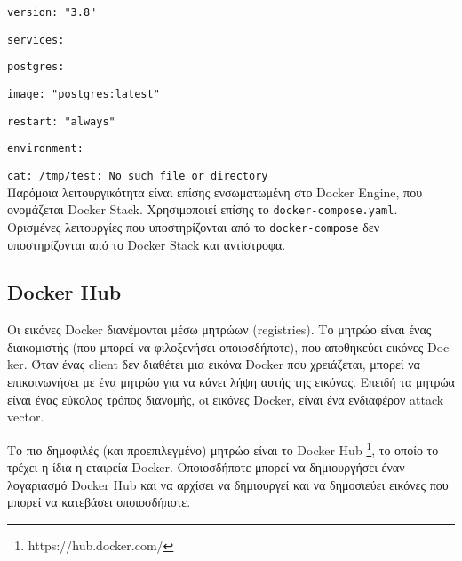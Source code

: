 \texttt{\textlatin{version: "3.8"}}

\texttt{\textlatin{services:}}

\texttt{\textlatin{postgres:}}

\texttt{\textlatin{image: "postgres:latest"}}

\texttt{\textlatin{restart: "always"}}

\texttt{\textlatin{environment:}}

\texttt{\textlatin{cat: /tmp/test: No such file or directory}} \\

Παρόμοια λειτουργικότητα είναι επίσης ενσωματωμένη στο
\textlatin{Docker Engine}, που ονομάζεται \textlatin{Docker Stack}.
Χρησιμοποιεί επίσης το \texttt{\textlatin{docker-compose.yaml}}. Ορισμένες
λειτουργίες που υποστηρίζονται από το \texttt{\textlatin{docker-compose}} δεν
υποστηρίζονται από το \textlatin{Docker Stack} και αντίστροφα.


\subsection{\textlatin{Docker Hub}}

Οι εικόνες \textlatin{Docker} διανέμονται μέσω μητρώων (\textlatin{registries}).
Το μητρώο είναι ένας διακομιστής (που μπορεί να φιλοξενήσει οποιοσδήποτε),
που αποθηκεύει εικόνες \textlatin{Docker}. Όταν ένας \textlatin{client} δεν
διαθέτει μια εικόνα \textlatin{Docker} που χρειάζεται, μπορεί να επικοινωνήσει
με ένα μητρώο για να κάνει λήψη αυτής της εικόνας. Επειδή τα μητρώα είναι ένας
εύκολος τρόπος διανομής, oι εικόνες \textlatin{Docker}, είναι ένα ενδιαφέρον
\textlatin{attack vector}.

Το πιο δημοφιλές (και προεπιλεγμένο) μητρώο είναι το \textlatin{Docker Hub}
\footnote{\textlatin{https://hub.docker.com/}}, το οποίο το τρέχει
η ίδια η εταιρεία \textlatin{Docker}. Οποιοσδήποτε μπορεί να
δημιουργήσει έναν λογαριασμό \textlatin{Docker Hub} και να αρχίσει να
δημιουργεί και να δημοσιεύει εικόνες που μπορεί να κατεβάσει οποιοσδήποτε.
